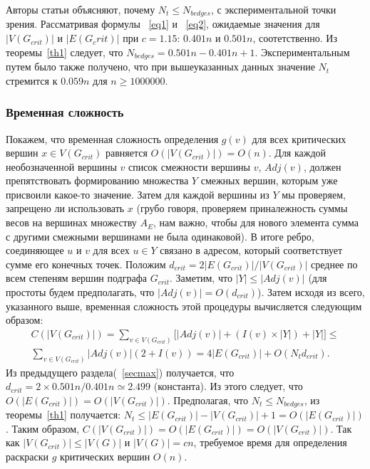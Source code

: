 \documentclass[specialist,
               substylefile = spbu.rtx,
               subf,href,colorlinks=true, 12pt]{disser}
\begin{document}
Авторы статьи объясняют, почему $N_{t} \leq N_{bedges}$, с экспериментальной точки зрения. Рассматривая формулы ~\ref{eq1} и ~\ref{eq2}, ожидаемые значения для $|V(G_{crit})|$ и $|E(G_crit)|$ при $c = 1.15$: $0.401n$ и $0.501n$, соотетственно. Из теоремы~\ref{th1} следует, что $N_{bedges} = 0.501n - 0.401n + 1$. Экспериментальным путем было также получено, что при вышеуказанных данных значение $N_{t}$ стремится к $0.059n$ для $n \geq 1000000$.

\subsubsection{Временная сложность}

Покажем, что временная сложность определения $g(v)$ для всех критических вершин $x \in V(G_{crit})$ равняется $\mathit{O}(|V(G_{crit})|) = \mathit{O}(n)$. Для каждой необозначенной вершины $v$ список смежности вершины $v$, $Adj(v)$, должен препятствовать формированию множества $Y$ смежных вершин, которым уже присвоили какое-то значение. Затем для каждой вершины из $Y$ мы проверяем, запрещено ли использовать $x$ (грубо говоря, проверяем приналежность суммы весов на вершинах множеству $A_E$, нам важно, чтобы для нового элемента сумма с другими смежными вершинами не была одинаковой). В итоге ребро, соединяющее $u$ и $v$ для всех $u \in Y$ связано в адресом, который соответствует сумме его конечных точек. Положим $d_{crit} = 2|E(G_{crit})|/|V(G_{crit})|$ среднее по всем степеням вершин подграфа $G_{crit}$. Заметим, что $|Y| \leq |Adj(v)|$ (для простоты будем предполагать, что $|Adj(v)| = \mathit{O}(d_{crit})$). Затем исходя из всего, указанного выше, временная сложность этой процедуры вычисляется следующим образом:
\begin{equation}
\begin{split}
\mathit{C}(|V(G_{crit})|) = \sum \limits_{v \in V(G_{crit})}\Big[ |Adj(v)| + (I(v) \times |Y|) + |Y|\Big] \leq \\
\sum \limits_{v \in V(G_{crit})} |Adj(v)|(2 + I(v)) = 4|E(G_{crit})| + \mathit{O}(N_{t}d_{crit}).
\end{split}
\end{equation}
Из предыдущего раздела(~\ref{secmax}) получается, что $d_{crit} = 2 \times 0.501n/0.401n \simeq 2.499$ (константа). Из этого следует, что $\mathit{O}(|E(G_{crit})|) = \mathit{O}(|V(G_{crit})|)$. Предполагая, что $N_{t} \leq N_{bedges}$, из теоремы~\ref{th1} получается: $N_{t} \leq |E(G_{crit})| - |V(G_{crit})| + 1 = \mathit{O}(|E(G_{crit})|)$. Таким образом, $\mathit{C}(|V(G_{crit})|) = \mathit{O}(|E(G_{crit})|) = \mathit{O}(|V(G_{crit})|)$. Так как $|V(G_{crit})| \leq |V(G)|$ и $|V(G)| = cn$, требуемое время для определения раскраски $g$ критических вершин $\mathit{O}(n)$.
\end{document}
